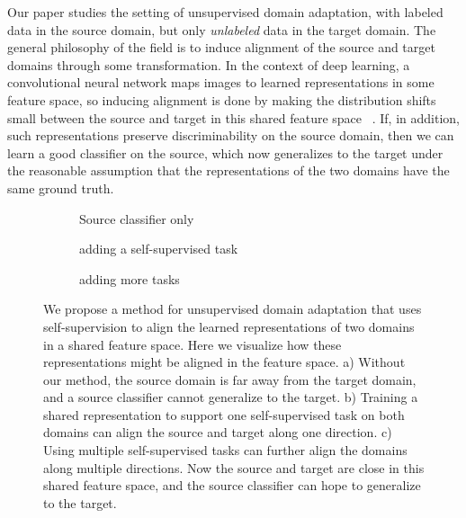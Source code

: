 \documentclass{article} \usepackage{iclr2020_conference,times}
\begin{document}
Our paper studies the setting of unsupervised domain adaptation, with labeled data in the source domain, but only \textit{unlabeled} data in the target domain. 
The general philosophy of the field is to induce alignment of the source and target domains through some transformation.
In the context of deep learning,
a convolutional neural network maps images to learned representations in some feature space, so inducing alignment is done by making the distribution shifts small between the source and target in this shared feature space
~\citep{csurka2017domain, wang2018deep, gopalan2011domain}.
If, in addition, such representations preserve discriminability on the source domain, then we can learn a good classifier on the source, which now generalizes to the target under the reasonable assumption that the representations of the two domains have the same ground truth.

\begin{figure}
	\begin{center}
		\setlength{\fboxsep}{0pt}
		\begin{subfigure}[b]{0.32\columnwidth}
			\quad
			\caption{Source classifier only}
		\end{subfigure}
		\hfill
		\begin{subfigure}[b]{0.32\columnwidth}
			\quad
			\caption{adding a self-supervised task}
		\end{subfigure}
		\hfill
		\begin{subfigure}[b]{0.32\columnwidth}
			\quad
			\caption{adding more tasks}
		\end{subfigure}
	\end{center}
	\vspace{-.15in}
	\caption{\small
		We propose a method for unsupervised domain adaptation that uses self-supervision to align the learned representations of two domains in a shared feature space. Here we visualize how these representations might be aligned in the feature space.
		a) Without our method, the source domain is far away from the target domain, and a source classifier cannot generalize to the target.
		b) Training a shared representation to support one self-supervised task on both domains can align the source and target along one direction.
		c) Using multiple self-supervised tasks can further align the domains along multiple directions. Now the source and target are close in this shared feature space, and the source classifier can hope to generalize to the target.
	}
	\label{fig:alignment}
\end{figure}
\end{document}
